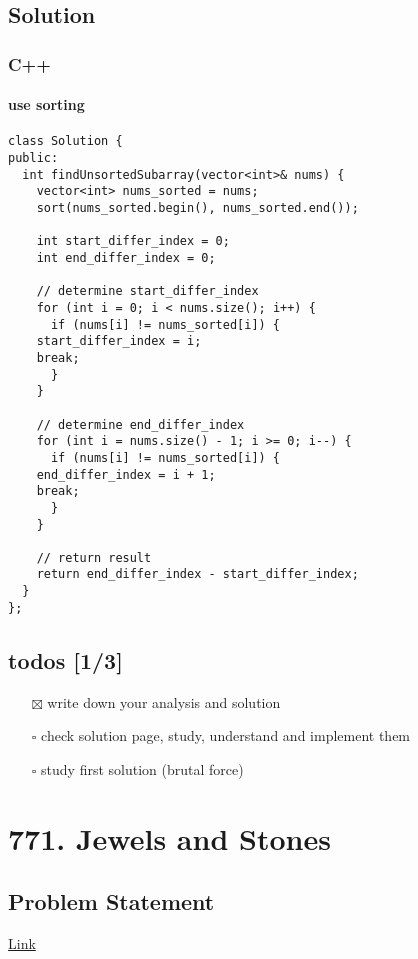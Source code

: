 \documentclass[12pt]{book}
\begin{document}
\section{Solution}
\label{sec:orgd19f201}
\subsection{C++}
\label{sec:org73418da}
\subsubsection{use sorting}
\label{sec:orgab4662b}
\begin{verbatim}
class Solution {
public:
  int findUnsortedSubarray(vector<int>& nums) {
    vector<int> nums_sorted = nums;
    sort(nums_sorted.begin(), nums_sorted.end());

    int start_differ_index = 0;
    int end_differ_index = 0;

    // determine start_differ_index
    for (int i = 0; i < nums.size(); i++) {
      if (nums[i] != nums_sorted[i]) {
	start_differ_index = i;
	break;
      }
    }

    // determine end_differ_index
    for (int i = nums.size() - 1; i >= 0; i--) {
      if (nums[i] != nums_sorted[i]) {
	end_differ_index = i + 1;
	break;
      }
    }

    // return result 
    return end_differ_index - start_differ_index;
  }
};
\end{verbatim}
\section{todos [1/3]}
\label{sec:orgc1e12b5}
\begin{itemize}
\item[{$\boxtimes$}] write down your analysis and solution
\item[{$\square$}] check solution page, study, understand and implement them
\item[{$\square$}] study first solution (brutal force)
\end{itemize}
\chapter{771. Jewels and Stones}
\label{sec:org734b68b}
\section{Problem Statement}
\label{sec:org85ca26d}
\href{https://leetcode.com/problems/jewels-and-stones/}{Link}
\end{document}
